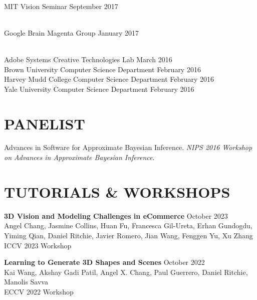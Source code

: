 \documentclass[line,margin]{res}
\begin{document}
\begin{resume}
\\
\talk
	{MIT}
	{Vision Seminar}
	{September 2017}

\\
\talk
	{Google Brain}
	{Magenta Group}
	{January 2017}

\\
\talk
	{Adobe Systems}
	{Creative Technologies Lab}
	{March 2016}\\
\talk
	{Brown University}
	{Computer Science Department}
	{February 2016}\\
\talk
	{Harvey Mudd College}
	{Computer Science Department}
	{February 2016}\\
\talk
	{Yale University}
	{Computer Science Department}
	{February 2016}


\section{PANELIST}

\newcommand{\panelist}[2]{
	#1. \emph{#2}.
}

\panelist{Advances in Software for Approximate Bayesian Inference}{NIPS 2016 Workshop on Advances in Approximate Bayesian Inference}


\section{TUTORIALS \& WORKSHOPS}

\newcommand{\tutorial}[4] {
	\textbf{#1} \hfill #4\\
	#2\\
	#3
}
\newcommand{\workshop}[4] {
	\textbf{#1} \hfill #4\\
	#2\\
	#3
}

\workshop
{3D Vision and Modeling Challenges in eCommerce}
{Angel Chang, Jasmine Collins, Huan Fu, Francesca Gil-Ureta, Erhan Gundogdu, Yiming Qian, Daniel Ritchie, Javier Romero, Jian Wang, Fenggen Yu, Xu Zhang}
{ICCV 2023 Workshop}
{October 2023}

\workshop
{Learning to Generate 3D Shapes and Scenes}
{Kai Wang, Akshay Gadi Patil, Angel X. Chang, Paul Guerrero, Daniel Ritchie, Manolis Savva}
{ECCV 2022 Workshop}
{October 2022}


\end{resume}
\end{document}
